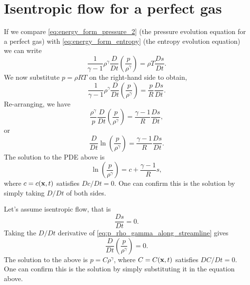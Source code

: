 \documentclass[oneside,a4paper,11pt]{report}
\begin{document}
\section{Isentropic flow for a perfect gas}
If we compare \cref{eq:energy_form_pressure_2} (the pressure evolution equation for a perfect gas) with \cref{eq:energy_form_entropy} (the entropy evolution equation) we can write
\begin{equation}
        \frac{1}{\gamma - 1} \rho^\gamma \frac{D}{D t} \left ( \frac{p}{\rho^\gamma} \right ) = \rho T \frac{Ds}{Dt}.
\end{equation}
We now substitute $p = \rho R T$ on the right-hand side to obtain,
\begin{equation}
    \frac{1}{\gamma - 1} \rho^\gamma \frac{D}{D t} \left ( \frac{p}{\rho^\gamma} \right ) = \frac{p}{R} \frac{Ds}{Dt}.
\end{equation}
Re-arranging, we have 
\begin{equation}
    \frac{\rho^\gamma}{p} \frac{D}{D t} \left ( \frac{p}{\rho^\gamma} \right ) = \frac{\gamma - 1}{R} \frac{Ds}{Dt},
\end{equation}
or 
\begin{equation}
    \frac{D}{D t} \ln \left ( \frac{p}{\rho^\gamma} \right ) = \frac{\gamma - 1}{R} \frac{Ds}{Dt}.
\end{equation}
The solution to the PDE above is
\begin{equation}
    \label{eq:p_rho_gamma_along_streamline}
    \ln \left ( \frac{p}{\rho^\gamma} \right ) = c + \frac{\gamma -1}{R} s,
\end{equation}
where $c=c(\mathbf{x},t)$ satisfies $Dc/Dt = 0$. One can confirm this is the solution by simply taking $D/Dt$ of both sides. 

Let's assume isentropic flow, that is 
\begin{equation}
\frac{Ds}{Dt} = 0. 
\end{equation}
Taking the $D/Dt$ derivative of \cref{eq:p_rho_gamma_along_streamline} gives
\begin{equation}
    \frac{D}{Dt} \left ( \frac{p}{\rho^\gamma} \right ) = 0.
\end{equation}
The solution to the above is $p = C \rho^\gamma$, where $C = C(\mathbf{x},t)$ satisfies $DC/Dt = 0$. One can confirm this is the solution by simply substituting it in the equation above.
\end{document}
